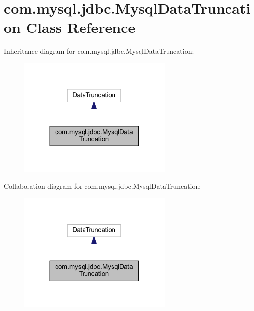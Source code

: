 \hypertarget{classcom_1_1mysql_1_1jdbc_1_1_mysql_data_truncation}{}\section{com.\+mysql.\+jdbc.\+Mysql\+Data\+Truncation Class Reference}
\label{classcom_1_1mysql_1_1jdbc_1_1_mysql_data_truncation}


Inheritance diagram for com.\+mysql.\+jdbc.\+Mysql\+Data\+Truncation\+:
\nopagebreak
\begin{figure}[H]
\begin{center}
\leavevmode
\includegraphics[width=215pt]{classcom_1_1mysql_1_1jdbc_1_1_mysql_data_truncation__inherit__graph}
\end{center}
\end{figure}


Collaboration diagram for com.\+mysql.\+jdbc.\+Mysql\+Data\+Truncation\+:
\nopagebreak
\begin{figure}[H]
\begin{center}
\leavevmode
\includegraphics[width=215pt]{classcom_1_1mysql_1_1jdbc_1_1_mysql_data_truncation__coll__graph}
\end{center}
\end{figure}
